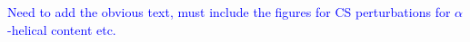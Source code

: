 \textcolor{blue}{Need to add the obvious text, must include the figures for CS perturbations for $\alpha$-helical content etc.}